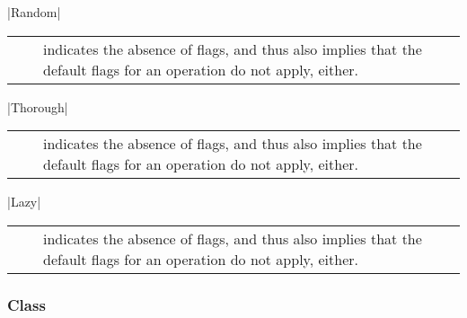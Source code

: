     |Random|\\[0.3mm]
    \begin{tabular}{cp{110mm}}
      ~~ & indicates the absence of flags, and thus also
           implies that the default flags for an operation do 
           not apply, either.
    \end{tabular}
 
    |Thorough|\\[0.3mm]
    \begin{tabular}{cp{110mm}}
      ~~ & indicates the absence of flags, and thus also
           implies that the default flags for an operation do 
           not apply, either.
    \end{tabular}
 
    |Lazy|\\[0.3mm]
    \begin{tabular}{cp{110mm}}
      ~~ & indicates the absence of flags, and thus also
           implies that the default flags for an operation do 
           not apply, either.
    \end{tabular}
 
 
 \subsubsection*{Class }
 

